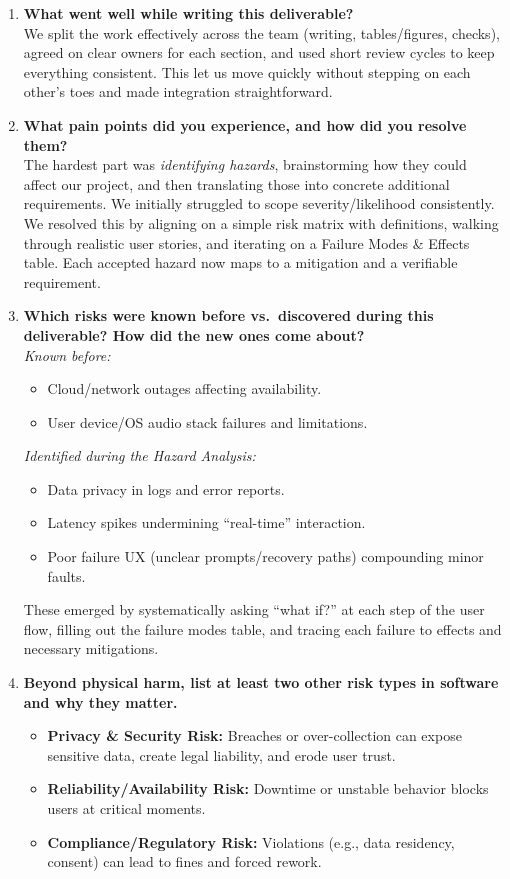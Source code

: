 \documentclass{article}
\begin{document}
\begin{enumerate}
  \item \textbf{What went well while writing this deliverable?}\\
  We split the work effectively across the team (writing, tables/figures, checks), agreed on clear owners for each section, and used short review cycles to keep everything consistent. This let us move quickly without stepping on each other’s toes and made integration straightforward.

  \item \textbf{What pain points did you experience, and how did you resolve them?}\\
  The hardest part was \emph{identifying hazards}, brainstorming how they could affect our project, and then translating those into concrete additional requirements. We initially struggled to scope severity/likelihood consistently. We resolved this by aligning on a simple risk matrix with definitions, walking through realistic user stories, and iterating on a Failure Modes \& Effects table. Each accepted hazard now maps to a mitigation and a verifiable requirement.

  \item \textbf{Which risks were known before vs.\ discovered during this deliverable? How did the new ones come about?}\\
  \textit{Known before:}
  \begin{itemize}
    \item Cloud/network outages affecting availability.
    \item User device/OS audio stack failures and limitations.
  \end{itemize}
  \textit{Identified during the Hazard Analysis:}
  \begin{itemize}
    \item Data privacy in logs and error reports.
    \item Latency spikes undermining “real-time” interaction.
    \item Poor failure UX (unclear prompts/recovery paths) compounding minor faults.
  \end{itemize}
  These emerged by systematically asking “what if?” at each step of the user flow, filling out the failure modes table, and tracing each failure to effects and necessary mitigations.

  \item \textbf{Beyond physical harm, list at least two other risk types in software and why they matter.}\\
  \begin{itemize}
    \item \textbf{Privacy \& Security Risk:} Breaches or over-collection can expose sensitive data, create legal liability, and erode user trust.
    \item \textbf{Reliability/Availability Risk:} Downtime or unstable behavior blocks users at critical moments.
    \item \textbf{Compliance/Regulatory Risk:} Violations (e.g., data residency, consent) can lead to fines and forced rework.
  \end{itemize}
\end{enumerate}
\end{document}
